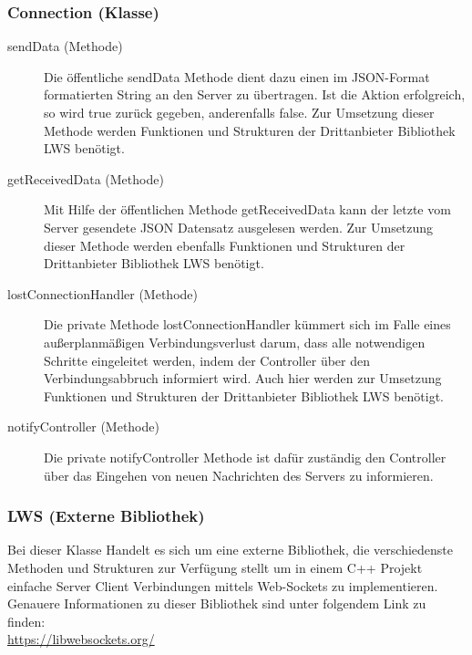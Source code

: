 	\subsubsection{Connection (Klasse)}    	
	
		\begin{description}
                
        	\item[sendData (Methode)]
        	Die öffentliche sendData Methode dient dazu einen im JSON-Format formatierten String an den Server zu übertragen. Ist die Aktion erfolgreich, so wird true zurück gegeben, anderenfalls false. Zur Umsetzung dieser Methode werden Funktionen und Strukturen der Drittanbieter Bibliothek LWS benötigt.
        	
        	\item[getReceivedData (Methode)]
			Mit Hilfe der öffentlichen Methode getReceivedData kann der letzte vom Server gesendete JSON Datensatz ausgelesen werden. Zur Umsetzung dieser Methode werden ebenfalls Funktionen und Strukturen der Drittanbieter Bibliothek LWS benötigt.    	
        	
        	\item[lostConnectionHandler (Methode)]
			Die private Methode lostConnectionHandler kümmert sich im Falle eines außerplanmäßigen Verbindungsverlust darum, dass alle notwendigen Schritte eingeleitet werden, indem der Controller über den Verbindungsabbruch informiert wird. Auch hier werden zur Umsetzung Funktionen und Strukturen der Drittanbieter Bibliothek LWS benötigt.          	
        	
        	\item[notifyController (Methode)]
        	Die private notifyController Methode ist dafür zuständig den Controller über das Eingehen von neuen Nachrichten des Servers zu informieren.
        	
    	\end{description}
    	
    \subsubsection{LWS (Externe Bibliothek)}
		Bei dieser Klasse Handelt es sich um eine externe Bibliothek, die verschiedenste Methoden und Strukturen zur Verfügung stellt um in einem C++ Projekt einfache Server Client Verbindungen mittels Web-Sockets zu implementieren. Genauere Informationen zu dieser Bibliothek sind unter folgendem Link zu finden: \\ \url{https://libwebsockets.org/}


